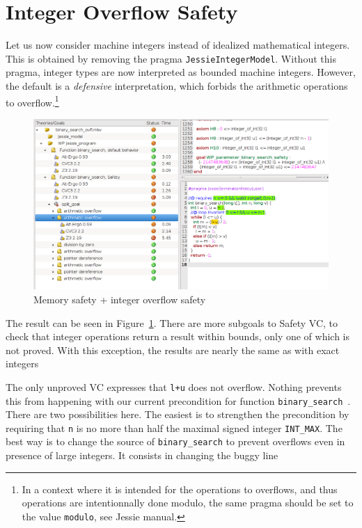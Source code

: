 \documentclass[a4paper,11pt,twoside,openright]{report}
\begin{document}
\section{Integer Overflow Safety}

Let us now consider machine integers instead of idealized mathematical
integers. This is obtained by removing the pragma
\texttt{JessieIntegerModel}.  Without this pragma, integer types are
now interpreted as bounded machine integers. However, the default is a
\emph{defensive} interpretation, which forbids the arithmetic
operations to overflow.\footnote{In a context where it is intended for
  the operations to overflows, and thus operations are intentionnally
  done modulo, the same pragma should be set to the value
  \texttt{modulo}, see Jessie manual.}

\begin{figure}[t]
  \includegraphics[width=\linewidth]{jessie/binary_search_ovfl.png}
  \caption{Memory safety + integer overflow safety}
  \label{fig:ovfl}
  \hrulefill
\end{figure}

The result can be seen in Figure~\ref{fig:ovfl}. There are more
subgoals to Safety VC, to check that integer operations return a
result within bounds, only one of which is not proved. With this
exception, the results are nearly the same as with exact integers

The only unproved VC expresses that \verb|l+u| does not overflow. 
Nothing prevents this from happening with our current
precondition for function \verb|binary_search|~\cite{Tuch_KN_07}. There are two
possibilities here. The easiest is to strengthen the precondition
by requiring that \verb|n| is no more than half the maximal signed
integer \verb|INT_MAX|. The best way is to change the source of
\verb|binary_search| to prevent overflows even in presence of large
integers. It consists in changing the buggy line
\end{document}
